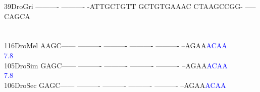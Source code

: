 \documentclass[11pt,twoside,reqno,a4paper]{article}
\begin{document}
{39\hspace*{2\charwidth}DroGri	----------	----------	-ATTGCTGTT	GCTGTGAAAC	CTAAGCCGG-	-----CAGCA	\\
\hspace*{4\charwidth}\hspace*{7\charwidth}\hspace*{1\charwidth}\hspace*{1\charwidth}\hspace*{1\charwidth}\hspace*{1\charwidth}\hspace*{1\charwidth}\hspace*{1\charwidth}\\
\\
116\hspace*{1\charwidth}DroMel	AAGC------	----------	----------	----------	----------	--AGAA\textcolor{blue}{A}\textcolor{blue}{C}\textcolor{blue}{A}\textcolor{blue}{A}	\\
\hspace*{4\charwidth}\hspace*{7\charwidth}\hspace*{1\charwidth}\hspace*{1\charwidth}\hspace*{1\charwidth}\hspace*{1\charwidth}\hspace*{1\charwidth}\hspace*{56\charwidth}\textcolor{blue}{7.8}\hspace*{1\charwidth}\\
105\hspace*{1\charwidth}DroSim	GAGC------	----------	----------	----------	----------	--AGAA\textcolor{blue}{A}\textcolor{blue}{C}\textcolor{blue}{A}\textcolor{blue}{A}	\\
\hspace*{4\charwidth}\hspace*{7\charwidth}\hspace*{1\charwidth}\hspace*{1\charwidth}\hspace*{1\charwidth}\hspace*{1\charwidth}\hspace*{1\charwidth}\hspace*{56\charwidth}\textcolor{blue}{7.8}\hspace*{1\charwidth}\\
106\hspace*{1\charwidth}DroSec	GAGC------	----------	----------	----------	----------	--AGAA\textcolor{blue}{A}\textcolor{blue}{C}\textcolor{blue}{A}\textcolor{blue}{A}	\\
}
\end{document}
